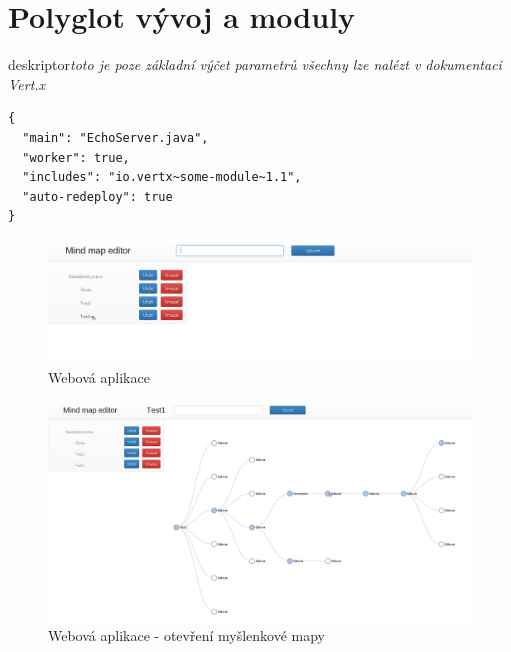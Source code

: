 \section{Polyglot vývoj a moduly}\label{sec:praktickyModuly}

 deskriptor\emph{toto je poze základní výčet parametrů všechny lze nalézt v dokumentaci Vert.x}

\begin{lstlisting}
{
  "main": "EchoServer.java",
  "worker": true,
  "includes": "io.vertx~some-module~1.1",
  "auto-redeploy": true
}
\end{lstlisting}

\begin{figure}
\begin{centering}
\includegraphics[width	=1\textwidth]{obrazky/mindmap1}
\par\end{centering}
\caption{Webová aplikace\label{fig:midnmap1}}
\end{figure}

\begin{figure}
\begin{centering}
\includegraphics[width	=1\textwidth]{obrazky/mindmap2}
\par\end{centering}
\caption{Webová aplikace - otevření myšlenkové mapy\label{fig:midnmap2}}
\end{figure}

